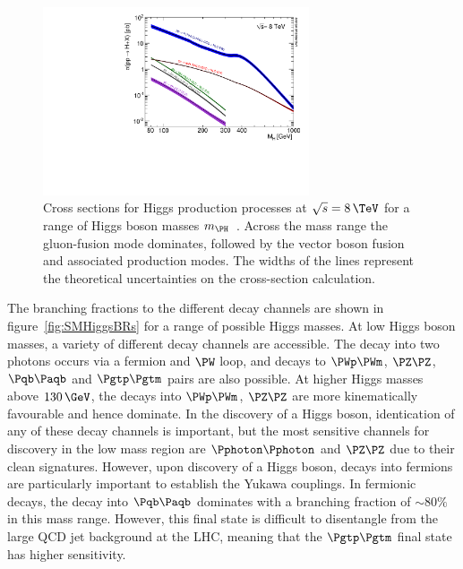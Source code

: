 \begin{figure}[htbp]
   \includegraphics[width=0.7\textwidth]{plots/theory/Higgs_XS_8TeV_lx.pdf}
\caption[Cross sections for Higgs production processes at $\sqrt{s}=8\,\TeV$ for
a range of Higgs boson masses.]{Cross sections for Higgs production processes at
$\sqrt{s}=8\,\TeV$ for a range of Higgs boson masses $m_{\PH}$~\cite{Heinemeyer:2013tqa}. Across the
mass range the gluon-fusion mode dominates, followed by the vector boson fusion
and associated production modes. The widths of the lines represent the
theoretical uncertainties on the cross-section calculation.}
\label{fig:SMHiggsXS}
\end{figure}

The branching fractions to the different decay channels are shown in
figure~\ref{fig:SMHiggsBRs} for a range of possible Higgs masses. At low Higgs
boson masses, a variety of different decay channels are accessible. The decay
into two photons occurs via a fermion and $\PW$ loop, and decays to $\PWp\PWm$, $\PZ\PZ$,
$\Pqb\Paqb$ and $\Pgtp\Pgtm$ pairs are also possible. At higher Higgs masses
above $130\,\GeV$, the decays into $\PWp\PWm$, $\PZ\PZ$ are more kinematically
favourable and hence dominate. In the discovery of a Higgs boson, identication of
any of these decay channels is important, but the most sensitive channels for
discovery in the low mass region are $\Pphoton\Pphoton$ and $\PZ\PZ$ due to
their clean signatures. However, upon discovery of a Higgs boson, decays into 
fermions are particularly important
to establish the Yukawa couplings. In fermionic decays, the decay into
$\Pqb\Paqb$ dominates with a branching fraction of $\sim 80\%$ in this mass
range. However, this final state is difficult to disentangle from the large QCD
jet background at the LHC, meaning that the $\Pgtp\Pgtm$ final state has higher sensitivity.

